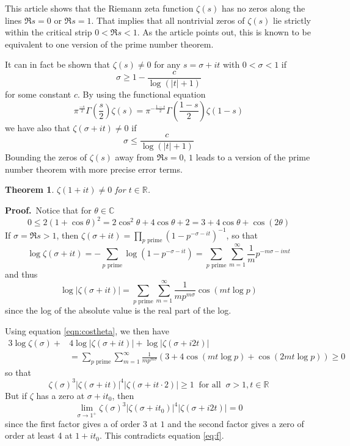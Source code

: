 \documentclass[12pt]{article}
\newcommand{\Reals}{\mathbb{R}}
\newcommand{\Complex}{\mathbb{C}}
\newtheorem{thm}{Theorem}
\begin{document}
This article shows that the Riemann zeta function $\zeta(s)$ has no zeros along the lines $\Re s=0$ or $\Re s=1$. That implies that all nontrivial zeros of $\zeta(s)$ lie strictly within the critical strip $0<\Re s<1$. As the  article points out, this is known to be equivalent to one version of the prime number theorem. 

It can in fact be shown that $\zeta(s)\neq 0$ for any $s=\sigma+it$ with $0<\sigma<1$ if
\[\sigma\geq 1-\frac{c}{\log(\lvert t\rvert+1)}\]
for some constant $c$. By using the functional equation
\[
  \pi^{\frac{-s}{2}}\Gamma\left(\frac{s}{2}\right)\zeta(s) =
     \pi^{-\frac{1-s}{2}}\Gamma\left(\frac{1-s}{2}\right)\zeta(1-s)
\]
we have also that $\zeta(\sigma+it)\neq 0$ if
\[\sigma \leq \frac{c}{\log(\lvert t\rvert+1)}\]
Bounding the zeros of $\zeta(s)$ away from $\Re s = 0$, $1$ leads to a version of the prime number theorem with more precise error terms.

\begin{thm} $\zeta(1+it)\neq 0$ for $t\in\Reals$.
\end{thm}

\textbf{Proof.}\ 
Notice that for $\theta\in\Complex$
\begin{equation}\label{eqn:costheta}
0\leq 2(1+\cos\theta)^2 = 2\cos^2\theta + 4\cos \theta + 2 = 3+4\cos\theta+\cos(2\theta)
\end{equation}
If $\sigma=\Re s>1$, then $\zeta(\sigma+it)=\prod_{p\text{ prime}} (1-p^{-\sigma-it})^{-1}$, so that
\[\log\zeta(\sigma+it)=-\sum_{p\text{ prime}} \log(1-p^{-\sigma-it}) = \sum_{p\text{ prime}} \sum_{m=1}^{\infty} \frac{1}{m}p^{-m\sigma-imt}\]
and thus
\[
\log\lvert\zeta(\sigma+it)\rvert = \sum_{p\text{ prime}}\sum_{m=1}^{\infty}\frac{1}{mp^{m\sigma}}\cos(mt\log p)
\]
since the log of the absolute value is the real part of the log.

Using equation \eqref{eqn:costheta}, we then have
\begin{align*}
3\log \zeta(\sigma) + & 4\log\lvert\zeta(\sigma+it)\rvert + \log\lvert\zeta(\sigma+i2t)\rvert \\
&= \sum_{p\text{ prime}}\sum_{m=1}^{\infty}\frac{1}{mp^{m\sigma}}(3+4\cos(mt\log p)+\cos(2mt\log p))\geq 0\end{align*}
so that
\begin{equation}\label{eq:f}\zeta(\sigma)^3\lvert\zeta(\sigma+it)\rvert^4\lvert\zeta(\sigma+it\cdot 2)\rvert\geq 1\ \text{ for all }\ \sigma>1, t\in\Reals\end{equation}
But if $\zeta$ has a zero at $\sigma+it_0$, then
\[\lim_{\sigma\to 1^+}\zeta(\sigma)^3\lvert\zeta(\sigma+it_0)\rvert^4\lvert\zeta(\sigma+i2t)\rvert=0\]
since the first factor gives a \PMlinkname{pole}{Pole} of order 3 at $1$ and the second factor gives a zero of order at least 4 at $1+it_0$. This contradicts equation \eqref{eq:f}.
\end{document}
